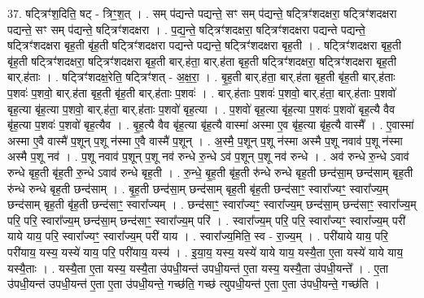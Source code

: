 \documentclass[17pt]{extarticle}
\begin{document}
37. षट्त्रिꣳ॑श॒दिति॒ षट् - त्रिꣳ॒॒श॒त् । . सम् प॑द्यन्ते पद्यन्ते॒ सꣳ सम् प॑द्यन्ते॒ षट्त्रिꣳ॑शदक्षरा॒ षट्त्रिꣳ॑शदक्षरा पद्यन्ते॒ सꣳ सम् प॑द्यन्ते॒ षट्त्रिꣳ॑शदक्षरा । . प॒द्य॒न्ते॒ षट्त्रिꣳ॑शदक्षरा॒ षट्त्रिꣳ॑शदक्षरा पद्यन्ते पद्यन्ते॒ षट्त्रिꣳ॑शदक्षरा बृह॒ती बृ॑ह॒ती षट्त्रिꣳ॑शदक्षरा पद्यन्ते पद्यन्ते॒ षट्त्रिꣳ॑शदक्षरा बृह॒ती । . षट्त्रिꣳ॑शदक्षरा बृह॒ती बृ॑ह॒ती षट्त्रिꣳ॑शदक्षरा॒ षट्त्रिꣳ॑शदक्षरा बृह॒ती बार्.ह॑ता॒ बार्.ह॑ता बृह॒ती षट्त्रिꣳ॑शदक्षरा॒ षट्त्रिꣳ॑शदक्षरा बृह॒ती बार्.ह॑ताः । . षट्त्रिꣳ॑शदक्ष॒रेति॒ षट्त्रिꣳ॑शत् - अ॒क्ष॒रा॒ । . बृ॒ह॒ती बार्.ह॑ता॒ बार्.ह॑ता बृह॒ती बृ॑ह॒ती बार्.ह॑ताः प॒शवः॑ प॒शवो॒ बार्.ह॑ता बृह॒ती बृ॑ह॒ती बार्.ह॑ताः प॒शवः॑ । . बार्.ह॑ताः प॒शवः॑ प॒शवो॒ बार्.ह॑ता॒ बार्.ह॑ताः प॒शवो॑ बृह॒त्या बृ॑ह॒त्या प॒शवो॒ बार्.ह॑ता॒ बार्.ह॑ताः प॒शवो॑ बृह॒त्या । . प॒शवो॑ बृह॒त्या बृ॑ह॒त्या प॒शवः॑ प॒शवो॑ बृह॒त्यै वैव बृ॑ह॒त्या प॒शवः॑ प॒शवो॑ बृह॒त्यैव । . बृ॒ह॒त्यै वैव बृ॑ह॒त्या बृ॑ह॒त्यै वास्मा॑ अस्मा ए॒व बृ॑ह॒त्या बृ॑ह॒त्यै वास्मै᳚ । . ए॒वास्मा॑ अस्मा ए॒वै वास्मै॑ प॒शून् प॒शू न॑स्मा ए॒वै वास्मै॑ प॒शून् । . अ॒स्मै॒ प॒शून् प॒शू न॑स्मा अस्मै प॒शू नवाव॑ प॒शू न॑स्मा अस्मै प॒शू नव॑ । . प॒शू नवाव॑ प॒शून् प॒शू नव॑ रुन्धे रु॒न्धे ऽव॑ प॒शून् प॒शू नव॑ रुन्धे । . अव॑ रुन्धे रु॒न्धे ऽवाव॑ रुन्धे बृह॒ती बृ॑ह॒ती रु॒न्धे ऽवाव॑ रुन्धे बृह॒ती । . रु॒न्धे॒ बृ॒ह॒ती बृ॑ह॒ती रु॑न्धे रुन्धे बृह॒ती छन्द॑सा॒म् छन्द॑साम् बृह॒ती रु॑न्धे रुन्धे बृह॒ती छन्द॑साम् । . बृ॒ह॒ती छन्द॑सा॒म् छन्द॑साम् बृह॒ती बृ॑ह॒ती छन्द॑साꣳ॒॒ स्वारा᳚ज्यꣳ॒॒ स्वारा᳚ज्य॒म् छन्द॑साम् बृह॒ती बृ॑ह॒ती छन्द॑साꣳ॒॒ स्वारा᳚ज्यम् । . छन्द॑साꣳ॒॒ स्वारा᳚ज्यꣳ॒॒ स्वारा᳚ज्य॒म् छन्द॑सा॒म् छन्द॑साꣳ॒॒ स्वारा᳚ज्य॒म् परि॒ परि॒ स्वारा᳚ज्य॒म् छन्द॑सा॒म् छन्द॑साꣳ॒॒ स्वारा᳚ज्य॒म् परि॑ । . स्वारा᳚ज्य॒म् परि॒ परि॒ स्वारा᳚ज्यꣳ॒॒ स्वारा᳚ज्य॒म् परी॑ याये याय॒ परि॒ स्वारा᳚ज्यꣳ॒॒ स्वारा᳚ज्य॒म् परी॑ याय । . स्वारा᳚ज्य॒मिति॒ स्व - रा॒ज्य॒म् । . परी॑याये याय॒ परि॒ परी॑याय॒ यस्य॒ यस्ये॑ याय॒ परि॒ परी॑याय॒ यस्य॑ । . इ॒या॒य॒ यस्य॒ यस्ये॑ याये याय॒ यस्यै॒ता ए॒ता यस्ये॑ याये याय॒ यस्यै॒ताः । . यस्यै॒ता ए॒ता यस्य॒ यस्यै॒ता उ॑पधी॒यन्त॑ उपधी॒यन्त॑ ए॒ता यस्य॒ यस्यै॒ता उ॑पधी॒यन्ते᳚ । . ए॒ता उ॑पधी॒यन्त॑ उपधी॒यन्त॑ ए॒ता ए॒ता उ॑पधी॒यन्ते॒ गच्छ॑ति॒ गच्छ॑ त्युपधी॒यन्त॑ ए॒ता ए॒ता उ॑पधी॒यन्ते॒ गच्छ॑ति । \newline
\pagebreak
{}
\end{document}

